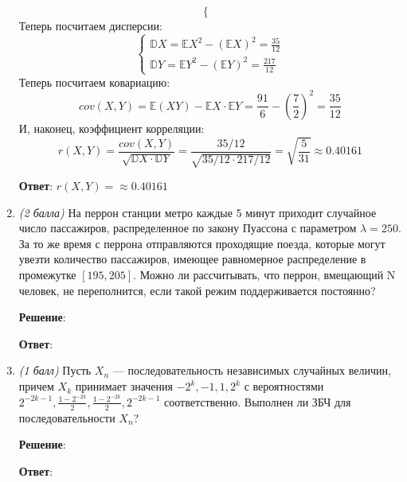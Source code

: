 \documentclass{article}
\begin{document}
\begin{enumerate}
\begin{equation}
\begin{cases}
  \end{cases}
\end{equation}
Теперь посчитаем дисперсии:
\begin{equation}
  \begin{cases}
    \mathbb{D}X = \mathbb{E}X^2 - (\mathbb{E}X)^2 = \frac{35}{12} \\
    \mathbb{D}Y = \mathbb{E}Y^2 - (\mathbb{E}Y)^2 = \frac{217}{12}
  \end{cases}
\end{equation}
Теперь посчитаем ковариацию:
\begin{equation}
  cov (X, Y) = \mathbb{E}(XY) - \mathbb{E}X \cdot \mathbb{E}Y = \frac{91}{6} - \left(\frac{7}{2}\right)^2 = \frac{35}{12}
\end{equation}
И, наконец, коэффициент корреляции:
\begin{equation}
  r (X, Y) = \dfrac{cov (X, Y)}{\sqrt{\mathbb{D}X \cdot \mathbb{D}Y}} = \dfrac{35/12}{\sqrt{35/12 \cdot 217/12}} = \sqrt{\frac{5}{31}} \approx 0.40161
\end{equation}

\textbf{Ответ}:
$r (X, Y) = \approx 0.40161$

\item \textit{(2 балла)} На перрон станции метро каждые 5 минут приходит случайное число пассажиров, распределенное по закону Пуассона с параметром $\lambda = 250$. За то же время с перрона отправляются проходящие поезда, которые могут увезти количество пассажиров, имеющее равномерное распределение в промежутке $[195, 205]$. Можно ли рассчитывать, что перрон, вмещающий N человек, не переполнится, если такой режим поддерживается постоянно?

\textbf{Решение}:


\textbf{Ответ}:

\item \textit{(1 балл)} Пусть ${X_n}$ — последовательность независимых случайных величин, причем $X_k$ принимает значения $-2^k, -1, 1, 2^k$ с вероятностями $2^{-2k-1},\frac{1-2^{-2k}}{2},\frac{1-2^{-2k}}{2}, 2^{-2k-1}$ соответственно. Выполнен ли ЗБЧ для последовательности ${X_n}$?

\textbf{Решение}:


\textbf{Ответ}:





\end{enumerate}
\end{document}
